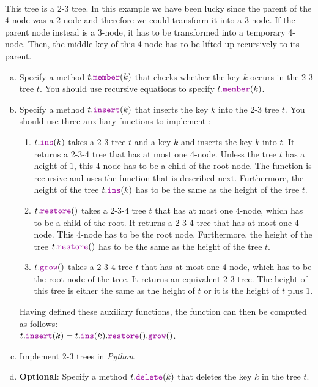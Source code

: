 \\[0.2cm]
This tree is a 2-3 tree.  In this example we have been lucky since the parent of the 4-node was
a 2 node and therefore we could transform it into a 3-node.  If the parent node instead is a 3-node,
it has to be transformed into a temporary 4-node.  Then, the middle key of this 4-node has to be
lifted up recursively to its parent.  
\begin{enumerate}[(a)]
\item Specify a method $t.\mytt{member}(k)$ that checks whether the key $k$ occurs in the 2-3 tree
      $t$.  You should use recursive equations to specify  $t.\mytt{member}(k)$.
\item Specify a method $t.\mytt{insert}(k)$ that inserts the key $k$ into the 2-3 tree
      $t$.  You should use three auxiliary functions to implement :
      \begin{enumerate}
      \item $t.\mytt{ins}(k)$ takes a 2-3 tree $t$ and a key $k$ and inserts the key $k$ into $t$.
            It returns a 2-3-4 tree that has at most one 4-node.  Unless the tree $t$ has a height of $1$, this
            4-node has to be a child of the root node.  The function  is recursive and uses the
            function  that is described next.
            Furthermore, the height of the tree $t.\mytt{ins}(k)$ has to be the same as the height of the tree $t$.
      \item $t.\mytt{restore}()$ takes a 2-3-4 tree $t$ that has at most one 4-node, which has to be a child
            of the root.  It returns a 2-3-4 tree that has at most one 4-node.  This 4-node has to be the root node.
            Furthermore, the height of the tree $t.\mytt{restore}()$ has to be the same as the height of the tree $t$.
      \item $t.\mytt{grow}()$ takes a 2-3-4 tree $t$ that has at most one 4-node, which has to be the root
            node of the tree.  It returns an equivalent 2-3 tree.  The height of this tree is either the same
            as the height of $t$ or it is the height of $t$ plus $1$.
      \end{enumerate}
      Having defined these auxiliary functions, the function  can then be computed as follows:
      \\[0.2cm]
      \hspace*{1.3cm}
      $t.\mytt{insert}(k) = t.\mytt{ins}(k).\mytt{restore}().\mytt{grow}()$.
\item Implement 2-3 trees in \textsl{Python}.
\item \textbf{Optional}: Specify a method $t.\mytt{delete}(k)$ that deletes the key $k$ in the tree $t$.


\end{enumerate}
